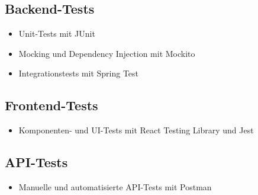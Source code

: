 \subsection{Backend-Tests}
\begin{itemize}
	\item Unit-Tests mit JUnit
	\item Mocking und Dependency Injection mit Mockito
	\item Integrationstests mit Spring Test
\end{itemize}

\subsection{Frontend-Tests}
\begin{itemize}
	\item Komponenten- und UI-Tests mit React Testing Library und Jest
\end{itemize}

\subsection{API-Tests}
\begin{itemize}
	\item Manuelle und automatisierte API-Tests mit Postman
\end{itemize}













